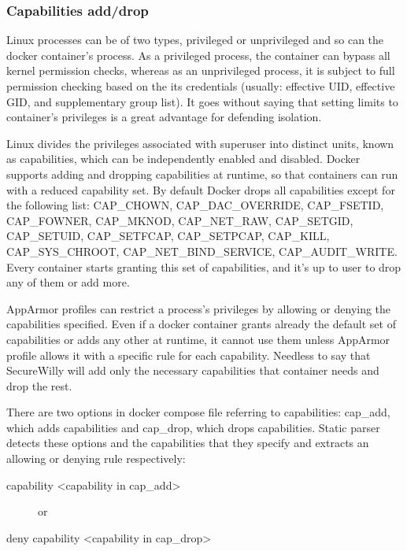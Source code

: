 \subsubsection{Capabilities add/drop}
Linux processes can be of two types, privileged or unprivileged and so can the docker container's process. As a privileged process, the container can bypass all kernel permission checks, whereas as an unprivileged process, it is subject to full permission checking based on the its credentials (usually: effective UID, effective GID, and supplementary group list).\cite{containercaps} It goes without saying that setting limits to container's privileges is a great advantage for defending isolation.

Linux divides the privileges associated with superuser into distinct units, known as capabilities, which can be independently enabled and disabled. Docker supports adding and dropping capabilities at runtime, so that containers can run with a reduced capability set. By default Docker drops all capabilities except for the following list: CAP\_CHOWN, CAP\_DAC\_OVERRIDE, CAP\_FSETID, CAP\_FOWNER, CAP\_MKNOD, CAP\_NET\_RAW, CAP\_SETGID, CAP\_SETUID, CAP\_SETFCAP, CAP\_SETPCAP, CAP\_KILL, \\CAP\_SYS\_CHROOT, CAP\_NET\_BIND\_SERVICE, CAP\_AUDIT\_WRITE. Every container starts granting this set of capabilities, and it's up to user to drop any of them or add more.

AppArmor profiles can restrict a process's privileges by allowing or denying the capabilities specified. Even if a docker container grants already the default set of capabilities or adds any other at runtime, it cannot use them unless AppArmor profile allows it with a specific rule for each capability. Needless to say that SecureWilly will add only the necessary capabilities that container needs and drop the rest.

There are two options in docker compose file referring to capabilities: cap\_add, which adds capabilities and cap\_drop, which drops capabilities. Static parser detects these options and the capabilities that they specify and extracts an allowing or denying rule respectively:

\begin{description}
\item[capability \textless capability in cap\_add\textgreater{}] or
\item[deny capability \textless capability in cap\_drop\textgreater{}]
\end{description}

